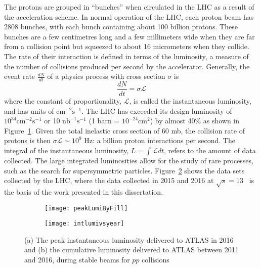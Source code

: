 The protons are grouped in ``bunches'' when circulated in the LHC as a result of the acceleration 
scheme.
In normal operation of the LHC, each proton beam has 2808 bunches, with each bunch containing 
about 100 billion protons. 
These bunches are a few centimetres long and a few millimeters wide when they are far from a 
collision point but squeezed to about 16 micrometers when they collide.
The rate of their interaction is defined in terms of the luminosity, a 
measure of the number of collisions produced per second by the accelerator.
Generally, the event rate $\frac{dN}{dt}$ of a physics process with cross section $\sigma$ is
\begin{equation}
\frac{dN}{dt} = \sigma  \mathcal{L} 
\label{eq:exp.lhc.lumi}
\end{equation}
where the constant of proportionality, $\mathcal{L}$, is called the instantaneous luminosity,
and has units of $\textrm{cm}^{-2}\textrm{s}^{-1}$.
The LHC has exceeded its design luminosity of $10^{34}\textrm{cm}^{-2}\textrm{s}^{-1}$ or 10 $\textrm{nb}^{-1}\textrm{s}^{-1}$ 
(1 barn = $10^{-24} \textrm{cm}^2$) 
by almost 40\% as shown in Figure~\ref{fig:exp.lhc.peakLumiByFill}.
Given the total inelastic cross section of 60 mb, 
the collision rate of protons is then $ \sigma  \mathcal{L} \sim 10^9$ Hz: a billion proton
interactions per second.
The integral of the instantaneous luminosity, $L = \int  \mathcal{L} dt$, refers to the amount 
of data collected. 
The large integrated luminosities allow for the study of rare processes, such as the search for 
supersymmetric particles.
Figure~\ref{fig:exp.lhc.intlumivsyear} shows the data sets collected by the LHC,
 where the data collected in 2015 and 2016 at $\sqrt{s}=13$ \TeV~is the basis of the work 
presented in this dissertation. 

\begin{figure}[!htb]
\centering
\begin{subfigure}[t]{0.48\textwidth}
\texttt{[image: peakLumiByFill]}
\subcaption{}
\label{fig:exp.lhc.peakLumiByFill}
\end{subfigure}
\begin{subfigure}[t]{0.48\textwidth}
\texttt{[image: intlumivsyear]}
\subcaption{}
\label{fig:exp.lhc.intlumivsyear}
\end{subfigure}
\vspace{-0.25cm}
\caption{(a) The peak instantaneous luminosity delivered to ATLAS in 2016
and (b) the cumulative luminosity delivered to ATLAS between 2011 and 2016, 
during stable beams for $pp$ collisions}
\label{fig:exp.lhc.peak}
\end{figure} 

